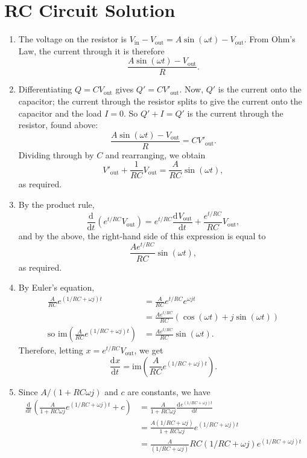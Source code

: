 \documentclass{article}
\newcommand{\deriv}[3][]{\frac{\mathrm{d}^{#1} #2}{\mathrm{d}#3^{#1}}}
\begin{document}
\clearpage


\section{RC Circuit Solution}


\begin{enumerate}
	\item The voltage on the resistor is $V_\mathrm{in}-V_\mathrm{out}=A\sin(\omega t)-V_\mathrm{out}$. From Ohm's Law, the current through it is therefore
		\[\frac{A\sin(\omega t)-V_\mathrm{out}}{R}.\]
	\item Differentiating $Q=CV_\mathrm{out}$ gives $Q'=CV'_\mathrm{out}$. Now, $Q'$ is the current onto the capacitor; the current through the resistor splits to give the current onto the capacitor and the load $I=0$. So $Q'+I=Q'$ is the current through the resistor, found above:
		\[\frac{A\sin(\omega t)-V_\mathrm{out}}{R}=CV'_\mathrm{out}.\]
		Dividing through by $C$ and rearranging, we obtain
		\[V'_\mathrm{out}+\frac{1}{RC}V_\mathrm{out}=\frac{A}{RC}\sin(\omega t),\]
		as required.
	\item By the product rule,
		\[\deriv{}{t}\left(e^{t/RC}V_\mathrm{out}\right)=e^{t/RC}\deriv{V_\mathrm{out}}{t}+\frac{e^{t/RC}}{RC}V_\mathrm{out},\]
		and by the above, the right-hand side of this expression is equal to
		\[\frac{Ae^{t/RC}}{RC}\sin(\omega t),\]
		as required.
	\item By Euler's equation,
		\begin{align*}
			\frac{A}{RC}e^{\left(1/RC+\omega j\right)t}&=\frac{A}{RC}e^{t/RC}e^{\omega jt}\\
			&=\frac{Ae^{t/RC}}{RC}\left(\cos(\omega t)+j\sin(\omega t)\right)\\
			\mbox{so   }\mathrm{im}\left(\frac{A}{RC}e^{\left(1/RC+\omega j\right)t}\right)&= \frac{Ae^{t/RC}}{RC}\sin(\omega t).
		\end{align*}
		Therefore, letting $x=e^{t/RC}V_\mathrm{out}$, we get
		\[\deriv{x}{t}=\mathrm{im}\left(\frac{A}{RC}e^{(1/RC+\omega j)t}\right).\]
	\item Since $A/(1+RC\omega j)$ and $c$ are constants, we have
		\begin{align*}
			\deriv{}{t}\left(\frac{A}{1+RC\omega j}e^{(1/RC+\omega j)t}+c\right)&=\frac{A}{1+RC\omega j}\deriv{e^{(1/RC+\omega j)t}}{t}\\
			&=\frac{A(1/RC+\omega j)}{1+RC\omega j}e^{(1/RC+\omega j)t}\\
			&=\frac{A}{(1/RC+\omega j)}{RC(1/RC+\omega j)}e^{(1/RC+\omega j)t}\\

\end{align*}
\end{enumerate}
\end{document}
